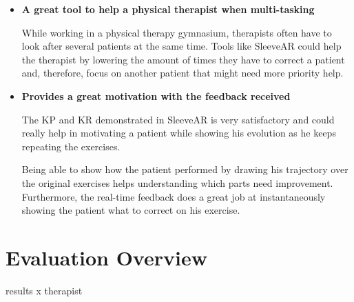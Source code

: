 \begin{itemize}
\item \textbf{A great tool to help a physical therapist when multi-tasking}

While working in a physical therapy gymnasium, therapists often have to look after several patients at the same time. Tools like SleeveAR could help the therapist by lowering the amount of times they have to correct a patient and, therefore, focus on another patient that might need more priority help.


\item \textbf{Provides a great motivation with the feedback received}

The \ac{KP} and \ac{KR} demonstrated in SleeveAR is very satisfactory and could really help in motivating a patient while showing his evolution as he keeps repeating the exercises.

Being able to show how the patient performed by drawing his trajectory over the original exercises helps understanding which parts need improvement. Furthermore, the real-time feedback does a great job at instantaneously showing the patient what to correct on his exercise.

\end{itemize}

\section{Evaluation Overview}

results x therapist 